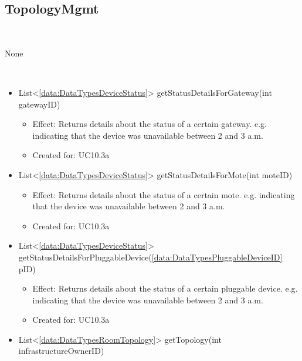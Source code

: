   \subsection{TopologyMgmt}\label{int:OnlineServiceOnlineServiceInfrastructureOwnerFacadeTopologyMgmt}
    \begin{description}
      \item[Provided by:] \iconcomponent{}~
      \item[Required by:] None
      \item[Operations:] ~
    \begin{itemize}[noitemsep,nolistsep,leftmargin=-.25cm]
      \item \textsf{List\textless{}\ref{data:DataTypesDeviceStatus}\textgreater{} getStatusDetailsForGateway(int gatewayID)}
        \begin{itemize}[noitemsep,nolistsep]
           \item Effect: Returns details about the status of a certain gateway. e.g. indicating that the device was unavailable between 2 and 3 a.m.
\item Created for: UC10.3a
        \end{itemize}
      \item \textsf{List\textless{}\ref{data:DataTypesDeviceStatus}\textgreater{} getStatusDetailsForMote(int moteID)}
        \begin{itemize}[noitemsep,nolistsep]
           \item Effect: Returns details about the status of a certain mote. e.g. indicating that the device was unavailable between 2 and 3 a.m.
\item Created for: UC10.3a
        \end{itemize}
      \item \textsf{List\textless{}\ref{data:DataTypesDeviceStatus}\textgreater{} getStatusDetailsForPluggableDevice(\ref{data:DataTypesPluggableDeviceID} pID)}
        \begin{itemize}[noitemsep,nolistsep]
           \item Effect: Returns details about the status of a certain pluggable device. e.g. indicating that the device was unavailable between 2 and 3 a.m.
\item Created for: UC10.3a
        \end{itemize}
      \item \textsf{List\textless{}\ref{data:DataTypesRoomTopology}\textgreater{} getTopology(int infrastructureOwnerID)}

\end{itemize}
\end{description}
